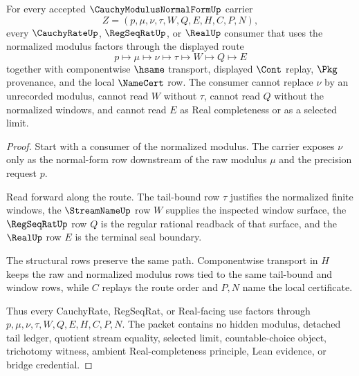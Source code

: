 \begin{theorem}
\label{thm:cauchy-modulus-normal-form-handoff}
For every accepted $\CauchyModulusNormalFormUp$ carrier
$$
Z=(p,\mu,\nu,\tau,W,Q,E,H,C,P,N),
$$
every $\CauchyRateUp$, $\RegSeqRatUp$, or $\RealUp$ consumer that uses the normalized modulus factors through the displayed route
$$
p\longmapsto \mu\longmapsto \nu\longmapsto \tau\longmapsto W\longmapsto Q\longmapsto E
$$
together with componentwise $\hsame$ transport, displayed $\Cont$ replay, $\Pkg$ provenance, and the local $\NameCert$ row. The consumer cannot replace $\nu$ by an unrecorded modulus, cannot read $W$ without $\tau$, cannot read $Q$ without the normalized windows, and cannot read $E$ as Real completeness or as a selected limit.
\end{theorem}
\begin{proof}
Start with a consumer of the normalized modulus. The carrier exposes $\nu$ only as the normal-form row downstream of the raw modulus $\mu$ and the precision request $p$.

Read forward along the route. The tail-bound row $\tau$ justifies the normalized finite windows, the $\StreamNameUp$ row $W$ supplies the inspected window surface, the $\RegSeqRatUp$ row $Q$ is the regular rational readback of that surface, and the $\RealUp$ row $E$ is the terminal seal boundary.

The structural rows preserve the same path. Componentwise transport in $H$ keeps the raw and normalized modulus rows tied to the same tail-bound and window rows, while $C$ replays the route order and $P,N$ name the local certificate.

Thus every CauchyRate, RegSeqRat, or Real-facing use factors through $p,\mu,\nu,\tau,W,Q,E,H,C,P,N$. The packet contains no hidden modulus, detached tail ledger, quotient stream equality, selected limit, countable-choice object, trichotomy witness, ambient Real-completeness principle, Lean evidence, or bridge credential.
\end{proof}



